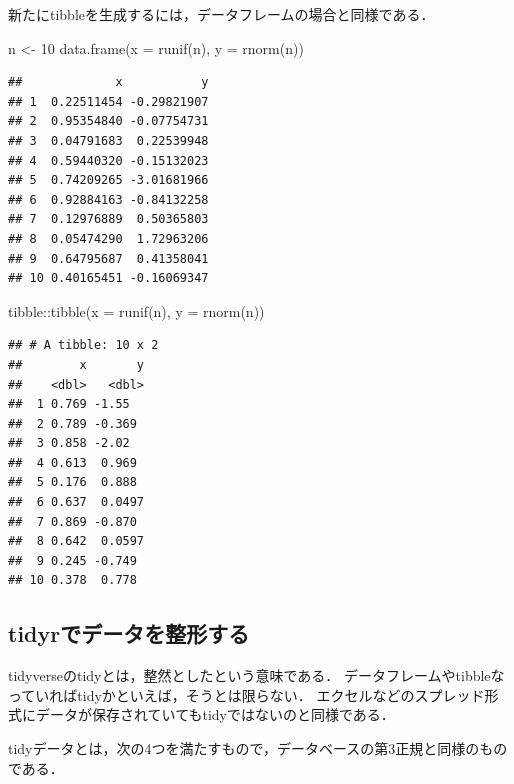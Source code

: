 \documentclass[
]{article}
\newenvironment{Shaded}{\begin{snugshade}}{\end{snugshade}}
\newcommand{\AttributeTok}[1]{\textcolor[rgb]{0.77,0.63,0.00}{#1}}
\newcommand{\DecValTok}[1]{\textcolor[rgb]{0.00,0.00,0.81}{#1}}
\newcommand{\FunctionTok}[1]{\textcolor[rgb]{0.00,0.00,0.00}{#1}}
\newcommand{\NormalTok}[1]{#1}
\newcommand{\OtherTok}[1]{\textcolor[rgb]{0.56,0.35,0.01}{#1}}
\newcommand{\SpecialCharTok}[1]{\textcolor[rgb]{0.00,0.00,0.00}{#1}}
\begin{document}
新たにtibbleを生成するには，データフレームの場合と同様である．

\begin{Shaded}
\begin{Highlighting}[]
\NormalTok{n }\OtherTok{\textless{}{-}} \DecValTok{10}
\FunctionTok{data.frame}\NormalTok{(}\AttributeTok{x =} \FunctionTok{runif}\NormalTok{(n), }\AttributeTok{y =} \FunctionTok{rnorm}\NormalTok{(n))}
\end{Highlighting}
\end{Shaded}

\begin{verbatim}
##             x           y
## 1  0.22511454 -0.29821907
## 2  0.95354840 -0.07754731
## 3  0.04791683  0.22539948
## 4  0.59440320 -0.15132023
## 5  0.74209265 -3.01681966
## 6  0.92884163 -0.84132258
## 7  0.12976889  0.50365803
## 8  0.05474290  1.72963206
## 9  0.64795687  0.41358041
## 10 0.40165451 -0.16069347
\end{verbatim}

\begin{Shaded}
\begin{Highlighting}[]
\NormalTok{tibble}\SpecialCharTok{::}\FunctionTok{tibble}\NormalTok{(}\AttributeTok{x =} \FunctionTok{runif}\NormalTok{(n), }\AttributeTok{y =} \FunctionTok{rnorm}\NormalTok{(n))}
\end{Highlighting}
\end{Shaded}

\begin{verbatim}
## # A tibble: 10 x 2
##        x       y
##    <dbl>   <dbl>
##  1 0.769 -1.55  
##  2 0.789 -0.369 
##  3 0.858 -2.02  
##  4 0.613  0.969 
##  5 0.176  0.888 
##  6 0.637  0.0497
##  7 0.869 -0.870 
##  8 0.642  0.0597
##  9 0.245 -0.749 
## 10 0.378  0.778
\end{verbatim}

\hypertarget{tidyrux3067ux30c7ux30fcux30bfux3092ux6574ux5f62ux3059ux308b}{%
\subsection{tidyrでデータを整形する}\label{tidyrux3067ux30c7ux30fcux30bfux3092ux6574ux5f62ux3059ux308b}}

tidyverseのtidyとは，整然としたという意味である．
データフレームやtibbleなっていればtidyかといえば，そうとは限らない．
エクセルなどのスプレッド形式にデータが保存されていてもtidyではないのと同様である．

tidyデータとは，次の4つを満たすもので，データベースの第3正規と同様のものである．
\end{document}
